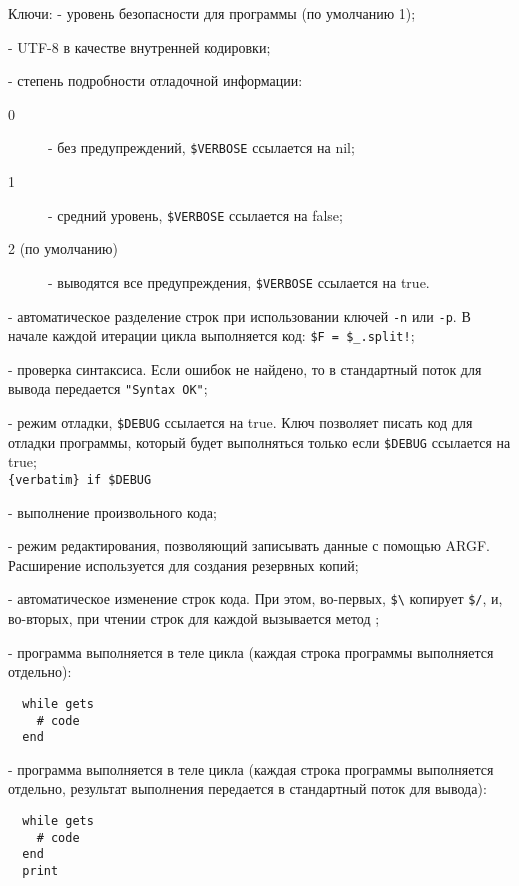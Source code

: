 \begin{keylist}{Ключи:}
   - уровень безопасности для программы (по умолчанию 1);
  
   - UTF-8 в качестве внутренней кодировки;

   - степень подробности отладочной информации:
  \begin{description}
    \item[0] - без предупреждений, \verb!$VERBOSE! ссылается на nil;
    \item[1] - средний уровень, \verb!$VERBOSE! ссылается на false;
    \item[2 (по умолчанию)] - выводятся все предупреждения, \verb!$VERBOSE! ссылается на true.
  \end{description}    
  
   - автоматическое разделение строк при использовании ключей \verb!-n! или \verb!-p!. В начале каждой итерации цикла выполняется код: \verb/$F = $_.split!/;

  - проверка синтаксиса. Если ошибок не найдено, то в стандартный поток для вывода передается \verb!"Syntax OK"!; 

   - режим отладки, \verb!$DEBUG! ссылается на true. Ключ позволяет писать код для отладки программы, который будет выполняться только если \verb!$DEBUG! ссылается на true;
  \\\verb!{verbatim} if $DEBUG! 
  
   - выполнение произвольного кода;

   - режим редактирования, позволяющий записывать данные с помощью ARGF. Расширение используется для создания резервных копий; 

   - автоматическое изменение строк кода. При этом, во-первых, \verb!$\! копирует \verb!$/!, и, во-вторых, при чтении строк для каждой вызывается метод ;

   - программа выполняется в теле цикла (каждая строка программы выполняется отдельно):  
  \begin{verbatim}
  while gets 
    # code 
  end
  \end{verbatim}    
  
   - программа выполняется в теле цикла (каждая строка программы выполняется отдельно, результат выполнения передается в стандартный поток для вывода):  
  \begin{verbatim}
  while gets 
    # code 
  end
  print
  \end{verbatim}
  

\end{keylist}
